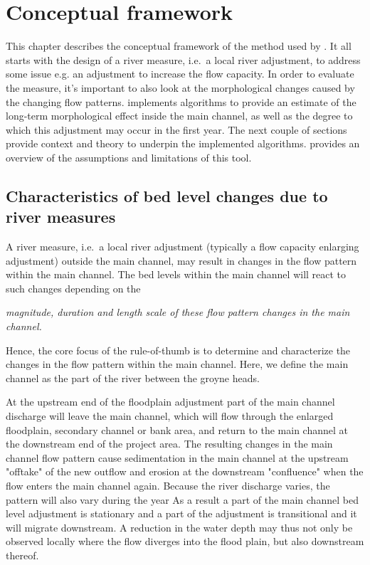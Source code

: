 \chapter{Conceptual framework} \label{Chp:Concepts}

This chapter describes the conceptual framework of the method used by \dfastmi.
It all starts with the design of a river measure, i.e.~a local river adjustment, to address some issue e.g. an adjustment to increase the flow capacity.
In order to evaluate the measure, it's important to also look at the morphological changes caused by the changing flow patterns.
\dfastmi implements algorithms to provide an estimate of the long-term morphological effect inside the main channel, as well as the degree to which this adjustment may occur in the first year.
The next couple of sections provide context and theory to underpin the implemented algorithms.
 provides an overview of the assumptions and limitations of this tool.


\section{Characteristics of bed level changes due to river measures}

A river measure, i.e.~a local river adjustment (typically a flow capacity enlarging adjustment) outside the main channel, may result in changes in the flow pattern within the main channel.
The bed levels within the main channel will react to such changes depending on the

\hspace{1cm}\emph{magnitude, duration and length scale of these flow pattern changes in the main channel.}

Hence, the core focus of the rule-of-thumb is to determine and characterize the changes in the flow pattern within the main channel.
Here, we define the main channel as the part of the river between the groyne heads.

At the upstream end of the floodplain adjustment part of the main channel discharge will leave the main channel, which will flow through the enlarged floodplain, secondary channel or bank area, and return to the main channel at the downstream end of the project area.
The resulting changes in the main channel flow pattern cause sedimentation in the main channel at the upstream "offtake" of the new outflow and erosion at the downstream "confluence" when the flow enters the main channel again.
Because the river discharge varies, the pattern will also vary during the year
As a result a part of the main channel bed level adjustment is stationary and a part of the adjustment is transitional and it will migrate downstream.
A reduction in the water depth may thus not only be observed locally where the flow diverges into the flood plain, but also downstream thereof.

